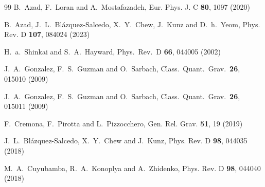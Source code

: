 \documentclass[aps,prd,12pt,superscriptaddress]{revtex4-2}
\begin{document}
\begin{thebibliography}{99}
B.~Azad, F.~Loran and A.~Mostafazadeh,
Eur. Phys. J. C \textbf{80}, 1097 (2020) 


B.~Azad, J.~L.~Bl\'azquez-Salcedo, X.~Y.~Chew, J.~Kunz and D.~h.~Yeom,
Phys. Rev. D \textbf{107}, 084024 (2023)

  H.~a.~Shinkai and S.~A.~Hayward,
  Phys.\ Rev.\ D {\bf 66}, 044005 (2002)

  J.~A.~Gonzalez, F.~S.~Guzman and O.~Sarbach,
  Class.\ Quant.\ Grav.\  {\bf 26}, 015010 (2009)

  J.~A.~Gonzalez, F.~S.~Guzman and O.~Sarbach,
  Class.\ Quant.\ Grav.\  {\bf 26},  015011 (2009)

F.~Cremona, F.~Pirotta and L.~Pizzocchero,
Gen. Rel. Grav. \textbf{51}, 19 (2019)

J.~L.~Bl\'azquez-Salcedo, X.~Y.~Chew and J.~Kunz,
Phys. Rev. D \textbf{98}, 044035 (2018)

M.~A.~Cuyubamba, R.~A.~Konoplya and A.~Zhidenko,
Phys. Rev. D \textbf{98}, 044040 (2018)


\end{thebibliography}
\end{document}
